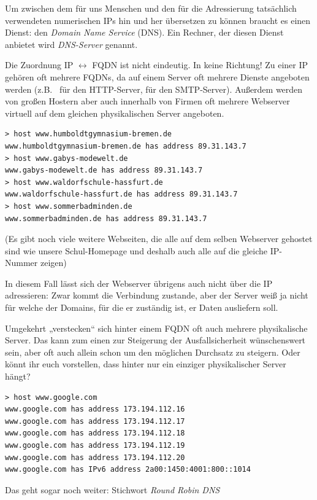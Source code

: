 Um zwischen dem für uns Menschen und den für die Adressierung tatsächlich verwendeten
numerischen IPs hin und her übersetzen zu können braucht es einen Dienst: den
\emph{Domain Name Service} (DNS). Ein Rechner, der diesen Dienst anbietet wird
\emph{DNS-Server} genannt.

Die Zuordnung IP $\leftrightarrow$ FQDN ist nicht eindeutig. In keine Richtung!
Zu einer IP gehören oft mehrere FQDNs, da auf einem Server oft mehrere Dienste
angeboten werden (z.B.\  für den HTTP-Server,
 für den SMTP-Server). Außerdem werden von großen
Hostern aber auch innerhalb von Firmen oft mehrere Webserver virtuell auf dem
gleichen physikalischen Server angeboten. 

\begin{lstlisting}
> host www.humboldtgymnasium-bremen.de
www.humboldtgymnasium-bremen.de has address 89.31.143.7
> host www.gabys-modewelt.de
www.gabys-modewelt.de has address 89.31.143.7
> host www.waldorfschule-hassfurt.de
www.waldorfschule-hassfurt.de has address 89.31.143.7
> host www.sommerbadminden.de
www.sommerbadminden.de has address 89.31.143.7
\end{lstlisting}

(Es gibt noch viele weitere Webseiten, die alle auf dem selben Webserver
gehostet sind wie unsere Schul-Homepage und deshalb auch alle auf die gleiche
IP-Nummer zeigen)

In diesem Fall lässt sich der Webserver übrigens auch nicht über die IP
adressieren: Zwar kommt die Verbindung zustande, aber der Server weiß ja nicht
für welche der Domains, für die er zuständig ist, er Daten ausliefern soll.

Umgekehrt „verstecken“ sich hinter einem FQDN oft auch mehrere physikalische
Server. Das kann zum einen zur Steigerung der Ausfallsicherheit wünschenswert
sein, aber oft auch allein schon um den möglichen Durchsatz zu steigern. Oder
könnt ihr euch vorstellen, dass hinter  nur ein
einziger physikalischer Server hängt?

\begin{lstlisting}
> host www.google.com
www.google.com has address 173.194.112.16
www.google.com has address 173.194.112.17
www.google.com has address 173.194.112.18
www.google.com has address 173.194.112.19
www.google.com has address 173.194.112.20
www.google.com has IPv6 address 2a00:1450:4001:800::1014
\end{lstlisting}

Das geht sogar noch weiter: Stichwort \emph{Round Robin DNS}


